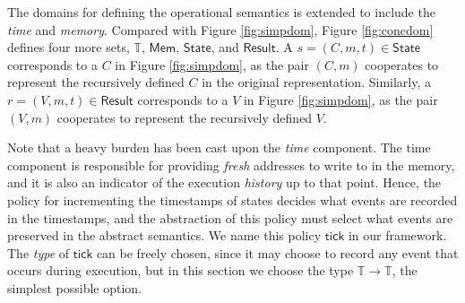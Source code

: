 \documentclass[acmsmall,screen,review]{acmart}\settopmatter{printfolios=true,printccs=false,printacmref=false}
\newcommand*{\Time}{\mathbb{T}}
\newcommand*{\Mem}{\mathsf{Mem}}
\newcommand*{\mem}{m}
\newcommand*{\State}{\mathsf{State}}
\newcommand*{\Result}{\mathsf{Result}}
\newcommand*{\tick}{\mathsf{tick}}
\begin{document}
The domains for defining the operational semantics is extended to include the \emph{time} and \emph{memory}.
Compared with Figure \ref{fig:simpdom}, Figure \ref{fig:concdom} defines four more sets, $\Time$, $\Mem$, $\State$, and $\Result$.
A $s=(C,\mem,t)\in\State$ corresponds to a $C$ in Figure \ref{fig:simpdom}, as the pair $(C,\mem)$ cooperates to represent the recursively defined $C$ in the original representation.
Similarly, a $r=(V,\mem,t)\in\Result$ corresponds to a $V$ in Figure \ref{fig:simpdom}, as the pair $(V,\mem)$ cooperates to represent the recursively defined $V$.

Note that a heavy burden has been cast upon the \emph{time} component.
The time component is responsible for providing \emph{fresh} addresses to write to in the memory, and it is also an indicator of the execution \emph{history} up to that point.
Hence, the policy for incrementing the timestamps of states decides what events are recorded in the timestamps, and the abstraction of this policy must select what events are preserved in the abstract semantics.
We name this policy $\tick$ in our framework.
The \emph{type} of $\tick$ can be freely chosen, since it may choose to record any event that occurs during execution, but in this section we choose the type $\Time\rightarrow\Time$, the simplest possible option.
\end{document}
